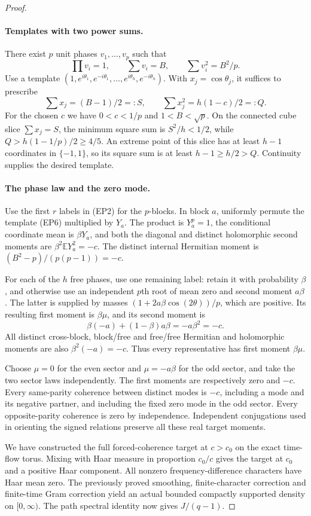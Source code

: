 \documentclass[11pt,a4paper]{article}
\theoremstyle{definition}\newtheorem{definition}[theorem]{Definition}
\theoremstyle{remark}\newtheorem{remark}[theorem]{Remark}
\begin{document}
\begin{proof}
\paragraph{Templates with two power sums.}
There exist $p$ unit phases $v_1,\ldots,v_p$ such that
\[
 \prod v_i=1,\qquad \sum v_i=B,\qquad \sum v_i^2=B^2/p.
\tag{EP6}
\]
Use a template $(1,e^{i\theta_1},e^{-i\theta_1},\ldots,
 e^{i\theta_h},e^{-i\theta_h})$. With $x_j=\cos\theta_j$,
it suffices to prescribe
\[
 \sum x_j=(B-1)/2=:S,\qquad
 \sum x_j^2=h(1-c)/2=:Q.
\]
For the chosen $c$ we have $0<c<1/p$ and $1<B<\sqrt p$.
On the connected cube slice $\sum x_j=S$, the minimum square sum
is $S^2/h<1/2$, while $Q>h(1-1/p)/2\ge4/5$.
An extreme point of this slice has at least $h-1$ coordinates
in $\{-1,1\}$, so its square sum is at least $h-1\ge h/2>Q$.
Continuity supplies the desired template.

\paragraph{The phase law and the zero mode.}
Use the first $r$ labels in (EP2) for the $p$-blocks. In block $a$,
uniformly permute the template (EP6) multiplied by $Y_a$.
The product is $Y_a^p=1$, the conditional coordinate mean is
$\beta Y_a$, and both the diagonal and distinct holomorphic
second moments are $\beta^2\mathbb EY_a^2=-c$.
The distinct internal Hermitian moment is
$(B^2-p)/(p(p-1))=-c$.

For each of the $h$ free phases, use one remaining label: retain
it with probability $\beta$, and otherwise use an independent
$p$th root of mean zero and second moment $a\beta$.
The latter is supplied by masses
$(1+2a\beta\cos(2\theta))/p$, which are positive.
Its resulting first moment is $\beta\mu$, and its second moment is
\[
 \beta(-a)+(1-\beta)a\beta=-a\beta^2=-c.
\]
All distinct cross-block, block/free and free/free Hermitian and
holomorphic moments are also $\beta^2(-a)=-c$.
Thus every representative has first moment $\beta\mu$.

Choose $\mu=0$ for the even sector and $\mu=-a\beta$ for the odd
sector, and take the two sector laws independently. The first
moments are respectively zero and $-c$. Every same-parity
coherence between distinct modes is $-c$, including a mode and
its negative partner, and including the fixed zero mode in the odd
sector. Every opposite-parity coherence is zero by independence.
Independent conjugations used in orienting the signed relations
preserve all these real target moments.

We have constructed the full forced-coherence target at $c>c_0$
on the exact time-flow torus. Mixing with Haar measure in proportion
$c_0/c$ gives the target at $c_0$ and a positive Haar component.
All nonzero frequency-difference characters have Haar mean zero.
The previously proved smoothing, finite-character correction and
finite-time Gram correction yield an actual bounded compactly
supported density on $[0,\infty)$. The path spectral identity now
gives $J/(q-1)$.
\end{proof}
\end{document}
